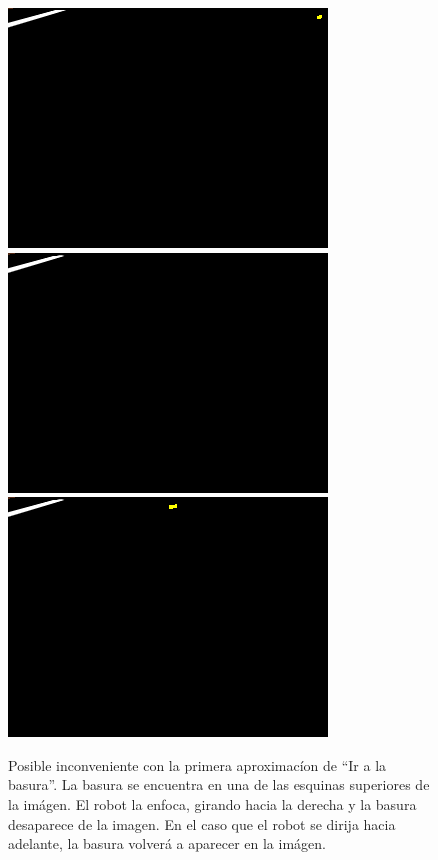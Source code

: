 \begin{figure}[htp]
\begin{center}
\includegraphics[scale=0.3]{comportamientos/figures/esquina.png}
\includegraphics[scale=0.3]{comportamientos/figures/frentemuylejos.png}
\includegraphics[scale=0.3]{comportamientos/figures/frentelejos.png}
\caption[Inconveniente con la primera aproximac\'ion de
		``Ir a la basura'']{Posible inconveniente con la primera aproximac\'ion
		de ``Ir a la basura''. La basura se encuentra en una de las
		esquinas superiores de la im\'agen. El robot la enfoca, girando
		hacia la derecha y la basura desaparece de la imagen. En el caso
		que el robot se dirija hacia adelante, la basura volver\'a a
		aparecer en la im\'agen.}
\label{fig:papproachgotoproblem}
\end{center}
\end{figure}

